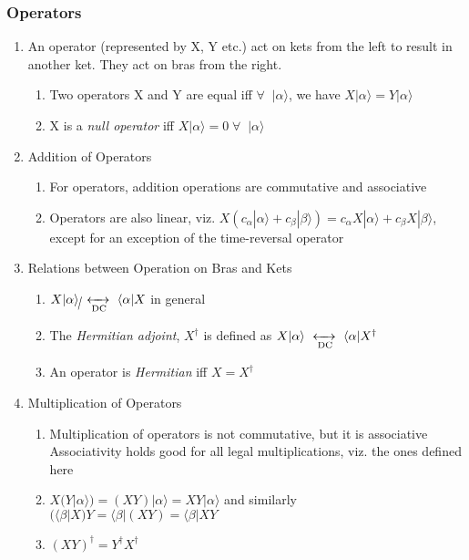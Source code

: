 \documentclass[12pt]{article}
\def\dc{\,\,\xleftrightarrow[\text{DC}]{}\,\,}
\def\bra#1{\langle#1|}
\def\ket#1{|#1 \rangle}
\def\ha#1{#1^\dagger}
\begin{document}
			\subsubsection{Operators}				
				\begin{enumerate}
					\item An operator (represented by X, Y etc.) act on kets from the left to result in another ket. They act on bras from the right.
					\begin{enumerate}
						\item Two operators X and Y are equal iff $\forall \; \; \ket \alpha$, we have $X\ket \alpha = Y\ket \alpha$
						\item X is a \emph{null operator} iff $X\ket \alpha = 0 \; \forall \;\; \ket \alpha$
					\end{enumerate}
					\item Addition of Operators
					\begin{enumerate}
						\item For operators, addition operations are commutative and associative
						\item Operators are also linear, viz. $X(c_\alpha \ket\alpha + c_\beta \ket \beta) = c_\alpha X \ket \alpha + c_\beta X \ket \beta$, except for an exception of the time-reversal operator
					\end{enumerate}
					\item Relations between Operation on Bras and Kets
					\begin{enumerate}
						\item $X \ket \alpha \cancel \dc \bra \alpha X$ in general
						\item The \emph{Hermitian adjoint}, $X^\dagger$ is defined as $X \ket \alpha \dc \bra \alpha X^\dagger$
						\item An operator is \emph{Hermitian} iff $X=X^\dagger$
					\end{enumerate}
					\item Multiplication of Operators
						\begin{enumerate}
							\item Multiplication of operators is not commutative, but it is associative\\
							Associativity holds good for all legal multiplications, viz. the ones defined here
							\item $X(Y \ket \alpha) = (XY) \ket \alpha = XY \ket \alpha$ and similarly $(\bra \beta X)Y = \bra \beta (XY) = \bra \beta XY$
							\item $\ha{(XY)}=\ha Y \ha X$

\end{enumerate}
\end{enumerate}
\end{document}

